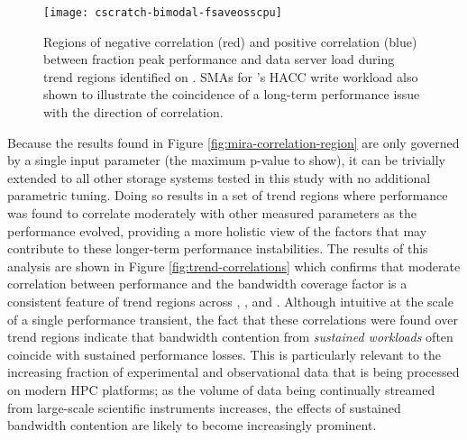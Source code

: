 \begin{figure}
    \centering
    \texttt{[image: cscratch-bimodal-fsaveosscpu]}
    \vspace{-.35in}
    \caption{Regions of negative correlation (red) and positive correlation (blue) between fraction peak performance and data server load during trend regions identified on \cori.
    SMAs for \cori's HACC write workload also shown to illustrate the coincidence of a long-term performance issue with the direction of correlation.}
    \label{fig:cscratch-bimodal-fsaveosscpu}
\end{figure}

Because the results found in Figure \ref{fig:mira-correlation-region} are only governed by a single input parameter (the maximum p-value to show), it can be trivially extended to all other storage systems tested in this study with no additional parametric tuning.
Doing so results in a set of trend regions where performance was found to correlate moderately with other measured parameters as the performance evolved, providing a more holistic view of the factors that may contribute to these longer-term performance instabilities.
The results of this analysis are shown in Figure \ref{fig:trend-correlations} which confirms that moderate correlation between performance and the bandwidth coverage factor is a consistent feature of trend regions across \mira, \cori, and \edison.
Although intuitive at the scale of a single performance transient, the fact that these correlations were found over trend regions indicate that bandwidth contention from \emph{sustained workloads} often coincide with sustained performance losses.
This is particularly relevant to the increasing fraction of experimental and observational data that is being processed on modern HPC platforms; as the volume of data being continually streamed from large-scale scientific instruments increases, the effects of sustained bandwidth contention are likely to become increasingly prominent.

